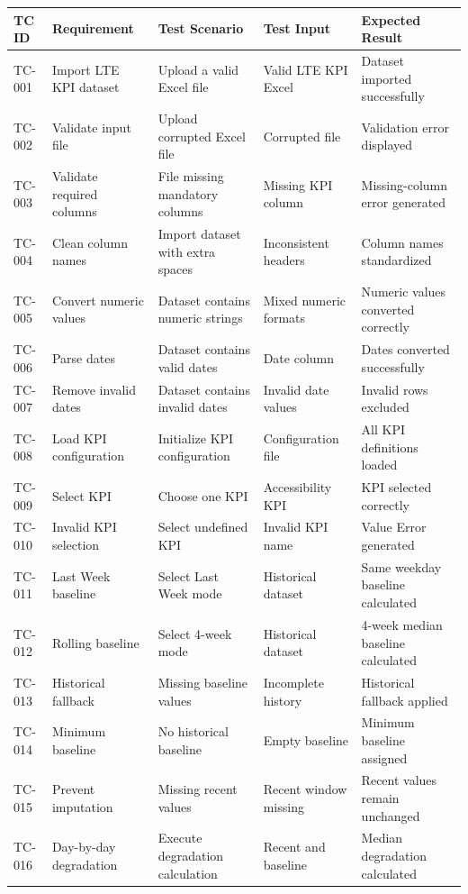 \begin{center}
\small
\begin{tabularx}{\textwidth}{l X X X X}
\toprule
\textbf{TC ID} & \textbf{Requirement} & \textbf{Test Scenario} & \textbf{Test Input} & \textbf{Expected Result} \\
\midrule
TC-001 & Import LTE KPI dataset & Upload a valid Excel file & Valid LTE KPI Excel & Dataset imported successfully \\
TC-002 & Validate input file & Upload corrupted Excel file & Corrupted file & Validation error displayed \\
TC-003 & Validate required columns & File missing mandatory columns & Missing KPI column & Missing-column error generated \\
TC-004 & Clean column names & Import dataset with extra spaces & Inconsistent headers & Column names standardized \\
TC-005 & Convert numeric values & Dataset contains numeric strings & Mixed numeric formats & Numeric values converted correctly \\
TC-006 & Parse dates & Dataset contains valid dates & Date column & Dates converted successfully \\
TC-007 & Remove invalid dates & Dataset contains invalid dates & Invalid date values & Invalid rows excluded \\
TC-008 & Load KPI configuration & Initialize KPI configuration & Configuration file & All KPI definitions loaded \\
TC-009 & Select KPI & Choose one KPI & Accessibility KPI & KPI selected correctly \\
TC-010 & Invalid KPI selection & Select undefined KPI & Invalid KPI name & Value Error generated \\
TC-011 & Last Week baseline & Select Last Week mode & Historical dataset & Same weekday baseline calculated \\
TC-012 & Rolling baseline & Select 4-week mode & Historical dataset & 4-week median baseline calculated \\
TC-013 & Historical fallback & Missing baseline values & Incomplete history & Historical fallback applied \\
TC-014 & Minimum baseline & No historical baseline & Empty baseline & Minimum baseline assigned \\
TC-015 & Prevent imputation & Missing recent values & Recent window missing & Recent values remain unchanged \\
TC-016 & Day-by-day degradation & Execute degradation calculation & Recent and baseline & Median degradation calculated \\

\end{tabularx}
\end{center}
